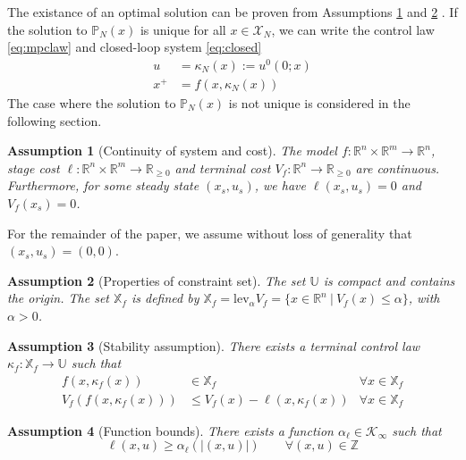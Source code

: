 \documentclass{article}
\newtheorem{assumption}{Assumption}
\newcommand{\abs}[1]{\left\lvert #1 \right\rvert}
\begin{document}
The existance of an optimal solution can be proven from Assumptions
\ref{as:continuity} and \ref{as:constraints}
\citep[p. 97-98]{rawlings:mayne:2009}. If the solution to $\mathbb{P}_N(x)$
is unique for all $x \in \mathcal{X}_N$, we can write the control law 
\eqref{eq:mpclaw} and closed-loop system \eqref{eq:closed}
\begin{align}
\label{eq:mpclaw}
 u &= \kappa_N(x) := u^0(0;x)\\
\label{eq:closed}
x^+ &= f(x,\kappa_N(x))
\end{align}
The case where the solution to $\mathbb{P}_N(x)$ is not unique is considered
in the following section.
\begin{assumption}[Continuity of system and cost]
\label{as:continuity}
The model $f:\mathbb{R}^n \times \mathbb{R}^m \rightarrow \mathbb{R}^n$, 
stage cost $\ell: \mathbb{R}^n \times \mathbb{R}^m \rightarrow \mathbb{R}_
{\geq 0}$ and terminal cost $V_f:\mathbb{R}^n \rightarrow \mathbb{R}_{\geq 0}$
are continuous. Furthermore, for some steady state $(x_s,u_s)$, we have $\ell(x_s,u_s)=0$
and $V_f(x_s) = 0$.
\end{assumption}
For the remainder of the paper, we assume without loss of generality that 
$(x_s,u_s) = (0,0)$.
\begin{assumption}[Properties of constraint set]
\label{as:constraints}
The set $\mathbb{U}$ is compact and contains the origin. 
The set $\mathbb{X}_f$ is defined by  $\mathbb{X}_f= \text{lev}_\alpha V_f = \{x \in \mathbb{R}^n \ | \ 
V_f(x) \leq \alpha\}$, with $\alpha > 0$.
\end{assumption}
\begin{assumption}[Stability assumption]
\label{as:terminalstability}
There exists a terminal control law $\kappa_f:\mathbb{X}_f \rightarrow
\mathbb{U}$ such that
\begin{align*}
f(x,\kappa_f(x)) &\in \mathbb{X}_f \qquad &\forall x \in \mathbb{X}_f\\
V_f(f(x,\kappa_f(x))) &\leq V_f(x)-\ell(x,\kappa_f(x))  
&\forall x \in \mathbb{X}_f
\end{align*}
\end{assumption}
\begin{assumption}[Function bounds]
\label{as:pdstagecost}
There exists a function $\alpha_\ell \in \mathcal{K}_\infty$ such that
\begin{equation*}
\ell(x,u) \geq \alpha_\ell(\abs{(x,u)}) \quad \quad \forall (x,u) \in \mathbb{Z}
\end{equation*}
\end{assumption}
\end{document}

